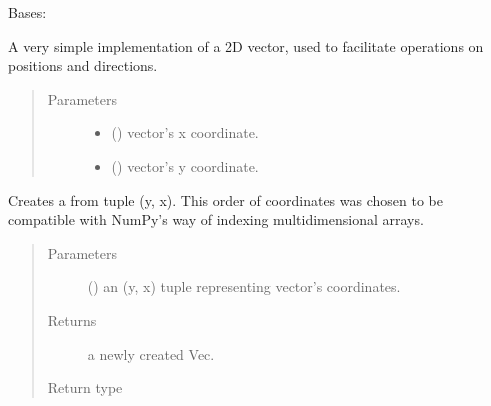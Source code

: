 \documentclass[letterpaper,10pt,english]{sphinxmanual}
\begin{document}
\begin{fulllineitems}
\label{\detokenize{util:util.Vec}}
Bases: 

A very simple implementation of a 2D vector, used to facilitate operations
on positions and directions.
\begin{quote}\begin{description}
\item[{Parameters}] \leavevmode\begin{itemize}
\item {} 
 () \textendash{} vector’s x coordinate.

\item {} 
 () \textendash{} vector’s y coordinate.

\end{itemize}

\end{description}\end{quote}

\begin{fulllineitems}
\label{\detokenize{util:util.Vec.fromtuple}}
Creates a {\hyperref[\detokenize{util:util.Vec}]{}} from tuple (y, x). This order of coordinates
was chosen to be compatible with NumPy’s way of indexing
multidimensional arrays.
\begin{quote}\begin{description}
\item[{Parameters}] \leavevmode
{} () \textendash{} an (y, x) tuple representing vector’s coordinates.

\item[{Returns}] \leavevmode
a newly created Vec.

\item[{Return type}] \leavevmode
{\hyperref[\detokenize{util:util.Vec}]{}}


\end{description}
\end{quote}
\end{fulllineitems}
\end{fulllineitems}
\end{document}
